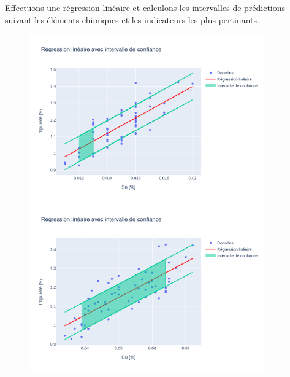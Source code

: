 \documentclass[12pt]{article}
\begin{document}

Effectuons une régression linéaire et calculons les intervalles de  prédictions 
suivant les éléments chimiques et les indicateurs les plus pertinants.


\begin{figure}[H]
    \centering
    \includegraphics[width=0.9\textwidth]{Images/Statistique/Regression_Impurete_Sn.pdf} %
    \vspace{10pt} %
    \includegraphics[width=0.9\textwidth]{Images/Statistique/Regression_Impurete_Cu.pdf}
\end{figure}
\end{document}
